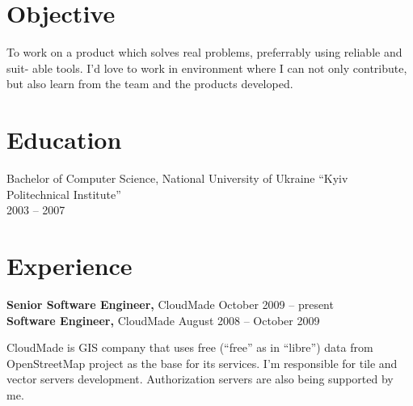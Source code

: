 \documentclass[margin]{res}
\begin{document}

\address{{\bf Address} \\ 19-345 General Naumov Street \\ Kyiv, Ukraine, 03164}

\address{{\bf Contacts} \\ +380 (50) 353-09-33 \\ contact@mishkovskyi.net \\ skype: andriy.mishkovskyy \\ \href{http://mishkovskyi.net}{mishkovskyi.net}}

\begin{resume}

\section{Objective}
To work on a product which solves real problems, preferrably using reliable and suit-
able tools. I’d love to work in environment where I can not only contribute, but also
learn from the team and the products developed.

\section{Education}
Bachelor of Computer Science, National University of Ukraine ``Kyiv Politechnical Institute'' \\
2003 -- 2007

\section{Experience}
{\bf Senior Software Engineer,} CloudMade \hfill October 2009 -- present\\
{\bf Software Engineer,} CloudMade \hfill August 2008 -- October 2009

CloudMade is GIS company that uses free
(``free'' as in ``libre'') data from OpenStreetMap project as
the base for its services. I'm responsible for tile and
vector servers development. Authorization servers are also
being supported by me.\\


\end{resume}
\end{document}
